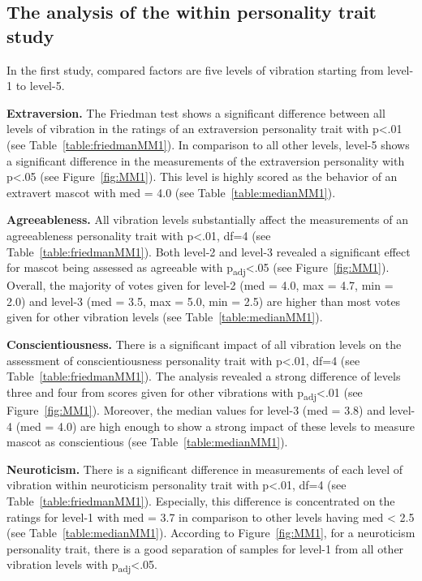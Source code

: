 \subsection{The analysis of the within personality trait study}
\label{subsec:MMstudy1}
In the first study, compared factors are five levels of vibration starting from level-1 to level-5.

\par\textbf{Extraversion.}
The Friedman test shows a significant difference between all levels of vibration in the
ratings of an extraversion personality trait with p<.01 (see Table~\ref{table:friedmanMM1}).
In comparison to all other levels, level-5 shows a significant difference
in the measurements of the extraversion personality with p<.05 (see Figure~\ref{fig:MM1}).
This level is highly scored as the behavior of an extravert mascot
with med = 4.0 (see Table~\ref{table:medianMM1}).

\par\textbf{Agreeableness.}
All vibration levels substantially affect the measurements of an agreeableness personality
trait with p<.01, df=4 (see Table~\ref{table:friedmanMM1}).
Both level-2 and level-3 revealed a significant effect for mascot being
assessed as agreeable with p\textsubscript{adj}<.05 (see Figure~\ref{fig:MM1}).
Overall, the majority of votes given for level-2 (med = 4.0, max = 4.7, min = 2.0) and level-3
(med = 3.5, max = 5.0, min = 2.5) are higher than most
votes given for other vibration levels (see Table~\ref{table:medianMM1}).

\par\textbf{Conscientiousness.}
There is a significant impact of all vibration levels on the assessment of conscientiousness
personality trait with p<.01, df=4 (see Table~\ref{table:friedmanMM1}).
The analysis revealed a strong difference of levels three and four
from scores given for other vibrations with p\textsubscript{adj}<.01 (see Figure~\ref{fig:MM1}).
Moreover, the median values for level-3 (med = 3.8) and level-4 (med = 4.0) are high enough
to show a strong impact of these levels to measure mascot as conscientious (see Table~\ref{table:medianMM1}).

\par\textbf{Neuroticism.}
There is a significant difference in measurements of each level of vibration within neuroticism
personality trait with p<.01, df=4 (see Table~\ref{table:friedmanMM1}).
Especially, this difference is concentrated on the ratings for level-1 with med = 3.7
in comparison to other levels having med < 2.5 (see Table~\ref{table:medianMM1}).
According to Figure~\ref{fig:MM1}, for a neuroticism personality trait, there is a good separation of samples for level-1
from all other vibration levels with p\textsubscript{adj}<.05.

